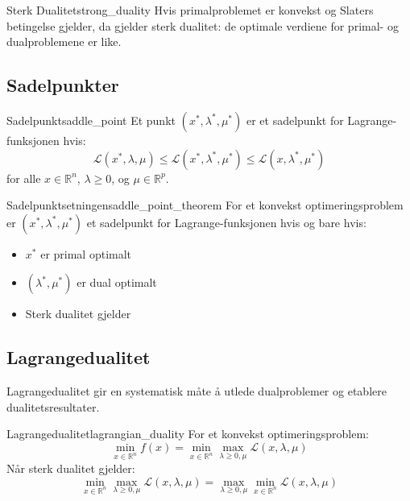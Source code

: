 \begin{theorem}{Sterk Dualitet}{strong_duality}
	Hvis primalproblemet er konvekst og Slaters betingelse gjelder, da gjelder sterk dualitet: de optimale verdiene for primal- og dualproblemene er like.
\end{theorem}

\subsection{Sadelpunkter}

\begin{definition}{Sadelpunkt}{saddle_point}
	Et punkt \( (x^*, \lambda^*, \mu^*) \) er et sadelpunkt for Lagrange-funksjonen hvis:
	\[
		\mathcal{L}(x^*, \lambda, \mu) \leq \mathcal{L}(x^*, \lambda^*, \mu^*) \leq \mathcal{L}(x, \lambda^*, \mu^*)
	\]
	for alle \( x \in \mathbb{R}^n \), \( \lambda \geq 0 \), og \( \mu \in \mathbb{R}^p \).
\end{definition}

\begin{theorem}{Sadelpunktsetningen}{saddle_point_theorem}
	For et konvekst optimeringsproblem er \( (x^*, \lambda^*, \mu^*) \) et sadelpunkt for Lagrange-funksjonen hvis og bare hvis:
	\begin{itemize}
		\item \( x^* \) er primal optimalt
		\item \( (\lambda^*, \mu^*) \) er dual optimalt
		\item Sterk dualitet gjelder
	\end{itemize}
\end{theorem}

\subsection{Lagrangedualitet}

Lagrangedualitet gir en systematisk måte å utlede dualproblemer og etablere dualitetsresultater.

\begin{theorem}{Lagrangedualitet}{lagrangian_duality}
	For et konvekst optimeringsproblem:
	\[
		\min_{x \in \mathbb{R}^n} f(x) = \min_{x \in \mathbb{R}^n} \max_{\lambda \geq 0, \mu} \mathcal{L}(x, \lambda, \mu)
	\]
	Når sterk dualitet gjelder:
	\[
		\min_{x \in \mathbb{R}^n} \max_{\lambda \geq 0, \mu} \mathcal{L}(x, \lambda, \mu) = \max_{\lambda \geq 0, \mu} \min_{x \in \mathbb{R}^n} \mathcal{L}(x, \lambda, \mu)
	\]
\end{theorem}

